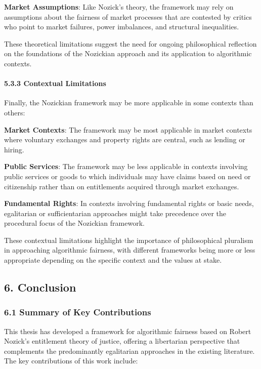 \textbf{Market Assumptions}: Like Nozick's theory, the framework may
rely on assumptions about the fairness of market processes that are
contested by critics who point to market failures, power imbalances, and
structural inequalities.

These theoretical limitations suggest the need for ongoing philosophical
reflection on the foundations of the Nozickian approach and its
application to algorithmic contexts.

\paragraph{5.3.3 Contextual Limitations}\label{contextual-limitations}

Finally, the Nozickian framework may be more applicable in some contexts
than others:

\textbf{Market Contexts}: The framework may be most applicable in market
contexts where voluntary exchanges and property rights are central, such
as lending or hiring.

\textbf{Public Services}: The framework may be less applicable in
contexts involving public services or goods to which individuals may
have claims based on need or citizenship rather than on entitlements
acquired through market exchanges.

\textbf{Fundamental Rights}: In contexts involving fundamental rights or
basic needs, egalitarian or sufficientarian approaches might take
precedence over the procedural focus of the Nozickian framework.

These contextual limitations highlight the importance of philosophical
pluralism in approaching algorithmic fairness, with different frameworks
being more or less appropriate depending on the specific context and the
values at stake.

\subsection{6. Conclusion}\label{conclusion}

\subsubsection{6.1 Summary of Key
Contributions}\label{summary-of-key-contributions}

This thesis has developed a framework for algorithmic fairness based on
Robert Nozick's entitlement theory of justice, offering a libertarian
perspective that complements the predominantly egalitarian approaches in
the existing literature. The key contributions of this work include:

